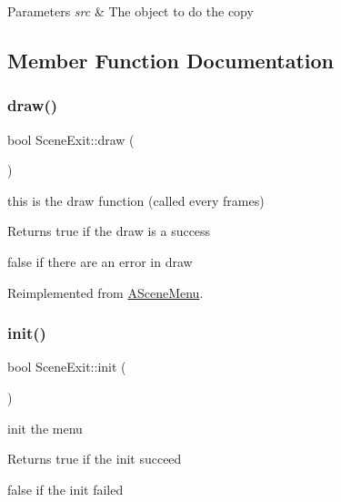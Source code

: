 \begin{DoxyParams}{Parameters}
{\em src} & The object to do the copy \\
\hline
\end{DoxyParams}


\subsection{Member Function Documentation}
\mbox{\label{class_scene_exit_a3b7110e736f86836568fdb2f8a997877}} 
\subsubsection{\texorpdfstring{draw()}{draw()}}
{\footnotesize\ttfamily bool Scene\+Exit\+::draw (\begin{DoxyParamCaption}{ }\end{DoxyParamCaption})\hspace{0.3cm}{\ttfamily [virtual]}}



this is the draw function (called every frames) 

\begin{DoxyReturn}{Returns}
true if the draw is a success 

false if there are an error in draw 
\end{DoxyReturn}


Reimplemented from \hyperlink{class_a_scene_menu_a5c11f34c83f025e1181219bf25ce4694}{A\+Scene\+Menu}.

\mbox{\label{class_scene_exit_ad9168291bb031fee797a7964590e1b73}} 
\subsubsection{\texorpdfstring{init()}{init()}}
{\footnotesize\ttfamily bool Scene\+Exit\+::init (\begin{DoxyParamCaption}{ }\end{DoxyParamCaption})\hspace{0.3cm}{\ttfamily [virtual]}}



init the menu 

\begin{DoxyReturn}{Returns}
true if the init succeed 

false if the init failed 
\end{DoxyReturn}


